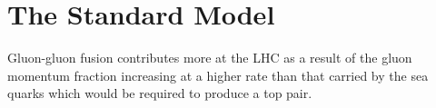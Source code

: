 \chapter{The Standard Model}
\label{c:the_standard_model}

Gluon-gluon fusion
contributes more at the LHC as a result of the gluon momentum fraction increasing at a higher rate than that
carried by the sea quarks which would be required to produce a top pair.